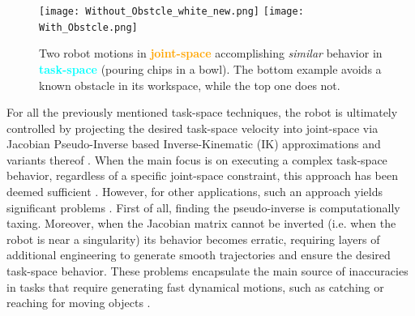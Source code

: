 \documentclass[letterpaper, 10 pt, conference,fleqn]{ieeeconf}
\begin{document}
\begin{figure}[t]
\centering
\texttt{[image: Without\_Obstcle\_white\_new.png]}
\texttt{[image: With\_Obstcle.png]}
\caption{Two robot motions in \textcolor{orange}{\textbf{joint-space}} accomplishing \textit{similar} behavior in \textcolor{cyan}{\textbf{task-space}} (pouring chips in a bowl). The bottom example avoids a known obstacle in its workspace, while the top one does not.}
\label{fig:robot_example}
\vspace{-10pt}
\end{figure}

For all the previously mentioned task-space techniques, the robot is ultimately controlled by projecting the desired task-space velocity into joint-space via Jacobian Pseudo-Inverse based Inverse-Kinematic (IK) approximations and variants thereof \cite{kelly2006control}. When the main focus is on executing a complex task-space behavior, regardless of a specific joint-space constraint, this approach has been deemed sufficient \cite{figueroa2016HRIrolling,ureche2015taskconst}. However, for other applications, such an approach yields significant problems \cite{buss2004introduction}. First of all, finding the pseudo-inverse is computationally taxing. Moreover, when the Jacobian matrix cannot be inverted (i.e. when the robot is near a singularity) its behavior becomes erratic, requiring layers of additional engineering to generate smooth trajectories and ensure the desired task-space behavior. These problems encapsulate the main source of inaccuracies in tasks that require generating fast dynamical motions, such as catching or reaching for moving objects \cite{7439839,Salehian-RSS-16}. 
\end{document}
